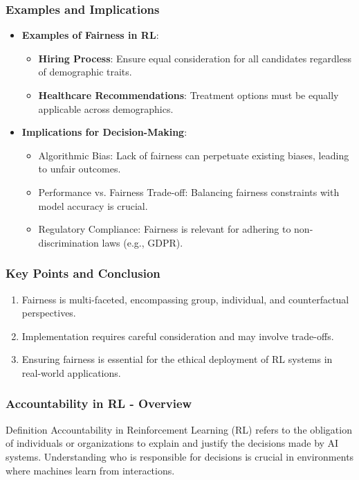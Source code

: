 \documentclass[aspectratio=169]{beamer}
\begin{document}
\begin{frame}[fragile]
    \frametitle{Examples and Implications}
    \begin{itemize}
        \item \textbf{Examples of Fairness in RL}:
            \begin{itemize}
                \item \textbf{Hiring Process}: Ensure equal consideration for all candidates regardless of demographic traits.
                \item \textbf{Healthcare Recommendations}: Treatment options must be equally applicable across demographics.
            \end{itemize}
        \item \textbf{Implications for Decision-Making}:
            \begin{itemize}
                \item Algorithmic Bias: Lack of fairness can perpetuate existing biases, leading to unfair outcomes.
                \item Performance vs. Fairness Trade-off: Balancing fairness constraints with model accuracy is crucial.
                \item Regulatory Compliance: Fairness is relevant for adhering to non-discrimination laws (e.g., GDPR).
            \end{itemize}
    \end{itemize}
\end{frame}

\begin{frame}[fragile]
    \frametitle{Key Points and Conclusion}
    \begin{enumerate}
        \item Fairness is multi-faceted, encompassing group, individual, and counterfactual perspectives.
        \item Implementation requires careful consideration and may involve trade-offs.
        \item Ensuring fairness is essential for the ethical deployment of RL systems in real-world applications.
    \end{enumerate}
\end{frame}

\begin{frame}[fragile]
  \frametitle{Accountability in RL - Overview}
  
  \begin{block}{Definition}
    Accountability in Reinforcement Learning (RL) refers to the obligation of individuals or organizations to explain and justify the decisions made by AI systems. Understanding who is responsible for decisions is crucial in environments where machines learn from interactions.
  \end{block}
  
\end{frame}
\end{document}
